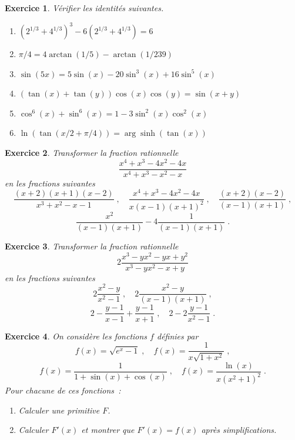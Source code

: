 \documentclass{article}
\newtheorem{exo}{Exercice}[section]
\begin{document}
\begin{giacjshere}
\begin{exo}{\rm
V\'erifier les identit\'es suivantes.
\begin{enumerate}
\item
$(2^{1/3}+4^{1/3})^3-6(2^{1/3}+4^{1/3})=6$
\item
$\pi /4 = 4\arctan(1/5)-\arctan(1/239)$
\item
$\sin(5x) = 5\sin(x)-20\sin^3(x)+16\sin^5(x)$
\item
$(\tan(x)+\tan(y))\cos(x)\cos(y) = \sin(x+y)$
\item
  $\cos^6(x)+\sin^6(x) = 1-3\sin^2(x)\cos^2(x)$
\item
$\ln(\tan(x/2+\pi/4)) = \arg\sinh(\tan(x))$
\end{enumerate}
}\end{exo}
\begin{exo}{\rm
Transformer la fraction rationnelle
$$
\frac{x^4+x^3-4x^2-4x}{x^4+x^3-x^2-x}
$$
en les fractions suivantes
$$
\frac{(x+2)(x+1)(x-2)}{x^3+x^2-x-1}
\;,\quad
\frac{x^4+x^3-4x^2-4x}{x(x-1)(x+1)^2}
\;,\quad
\frac{(x+2)(x-2)}{(x-1)(x+1)}\;,
$$
$$
\frac{x^2}{(x-1)(x+1)}-4\frac{1}{(x-1)(x+1)}\;.
$$
}\end{exo}
\begin{exo}{\rm
Transformer la fraction rationnelle
$$
2\frac{x^3-yx^2-yx+y^2}{x^3-yx^2-x+y}
$$
en les fractions suivantes
$$
2\frac{x^2-y}{x^2-1}
\;,\quad
2\frac{x^2-y}{(x-1)(x+1)}
\;,
$$
$$
2-\frac{y-1}{x-1}+\frac{y-1}{x+1}
\;,\quad
2-2\frac{y-1}{x^2-1}\;.
$$
}\end{exo}
\begin{exo}{\rm
On consid\`ere les fonctions $f$ d\'efinies par
$$
f(x) = \sqrt{e^x-1}
\;,\quad
f(x) = \frac{1}{x\sqrt{1+x^2}}
\;,
$$
$$
f(x) = \frac{1}{1+\sin(x)+\cos(x)}
\;,\quad
f(x) = \frac{\ln(x)}{x(x^2+1)^2}
 \;.
$$
Pour chacune de ces fonctions~:
\begin{enumerate}
\item
Calculer une primitive $F$.
\item
Calculer $F'(x)$ et montrer que $F'(x)=f(x)$ apr\`es simplifications.
\end{enumerate}
}\end{exo}


\end{giacjshere}
\end{document}
